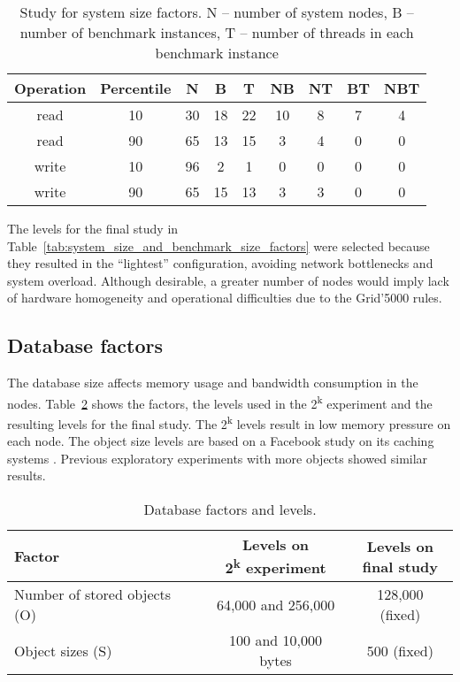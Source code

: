\documentclass[man,floatsintext,12pt]{apa6}
\begin{document}
\begin{table}[h!]
  \caption{Study for system size factors. N -- number of system nodes, B --
number of benchmark instances, T -- number of threads in each benchmark
instance}
  \label{tab:estudo_para_fatores_de_tamanho_do_sistema}
  \begin{tabular}{ccccccccc}         \toprule
  Operation & Percentile & N & B & T & NB & NT & BT & NBT\\ \midrule

  read & 10 & 30 & 18 & 22 & 10 & 8 & 7 & 4 \\

  read & 90 & 65 & 13 & 15 & 3 & 4 & 0 & 0 \\

  write & 10 & 96 & 2 & 1 & 0 & 0 & 0 & 0 \\

  write & 90 & 65 & 15 & 13 & 3 & 3 & 0 & 0 \\ \bottomrule
  \end{tabular}
\end{table}

The levels for the final study in
Table~\ref{tab:system_size_and_benchmark_size_factors} were selected because
they resulted in the ``lightest'' configuration, avoiding network bottlenecks
and system overload.  Although desirable, a greater number of nodes would imply
lack of hardware homogeneity and operational difficulties due to the Grid'5000
rules.
\subsection{Database factors}

The database size affects memory usage and bandwidth consumption in the nodes.
Table~\ref{tab:database_factors_and_levels} shows the factors, the levels used
in the 2\textsuperscript{k} experiment and the resulting levels for the final
study. The 2\textsuperscript{k} levels result in low memory pressure on each
node. The object size levels are based on a Facebook study on its caching
systems \parencite{Atikoglu2012}.  Previous exploratory experiments with more
objects showed similar results.

\begin{table}[h!]
\caption{Database factors and levels.}
\label{tab:database_factors_and_levels}
\begin{tabular}{lcc} \toprule
Factor & \thead{Levels on \\ 2\textsuperscript{k} experiment} & \thead{Levels on \\final study} \\ \midrule

Number of stored objects (O) & 64,000 and 256,000 & 128,000 (fixed)\\

Object sizes (S) & 100 and 10,000 bytes & 500 (fixed)\\ \bottomrule

\end{tabular}  
\end{table}
\end{document}
